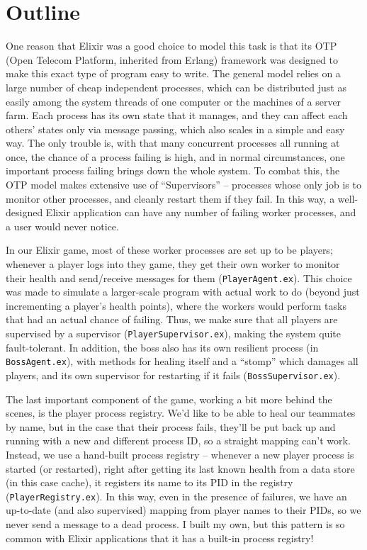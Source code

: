 \documentclass[letterpaper]{article}
\begin{document}
	\section{Outline}

	One reason that Elixir was a good choice to model this task is that its OTP (Open Telecom Platform, inherited from Erlang) framework was designed to make this exact type of program easy to write. The general model relies on a large number of cheap independent processes, which can be distributed just as easily among the system threads of one computer or the machines of a server farm. Each process has its own state that it manages, and they can affect each others' states only via message passing, which also scales in a simple and easy way. The only trouble is, with that many concurrent processes all running at once, the chance of a process failing is high, and in normal circumstances, one important process failing brings down the whole system. To combat this, the OTP model makes extensive use of ``Supervisors'' -- processes whose only job is to monitor other processes, and cleanly restart them if they fail. In this way, a well-designed Elixir application can have any number of failing worker processes, and a user would never notice.

	In our Elixir game, most of these worker processes are set up to be players; whenever a player logs into they game, they get their own worker to monitor their health and send/receive messages for them (\texttt{PlayerAgent.ex}). This choice was made to simulate a larger-scale program with actual work to do (beyond just incrementing a player's health points), where the workers would perform tasks that had an actual chance of failing. Thus, we make sure that all players are supervised by a supervisor (\texttt{PlayerSupervisor.ex}), making the system quite fault-tolerant. In addition, the boss also has its own resilient process (in \texttt{BossAgent.ex}), with methods for healing itself and a ``stomp'' which damages all players, and its own supervisor for restarting if it fails (\texttt{BossSupervisor.ex}).

	The last important component of the game, working a bit more behind the scenes, is the player process registry. We'd like to be able to heal our teammates by name, but in the case that their process fails, they'll be put back up and running with a new and different process ID, so a straight mapping can't work. Instead, we use a hand-built process registry -- whenever a new player process is started (or restarted), right after getting its last known health from a data store (in this case cache), it registers its name to its PID in the registry (\texttt{PlayerRegistry.ex}). In this way, even in the presence of failures, we have an up-to-date (and also supervised) mapping from player names to their PIDs, so we never send a message to a dead process. I built my own, but this pattern is so common with Elixir applications that it has a built-in process registry!
\end{document}
